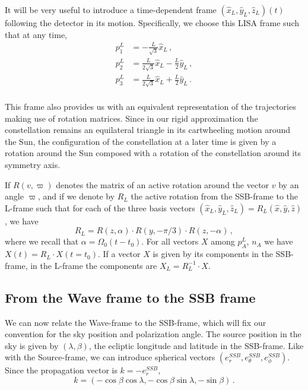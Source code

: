 \documentclass[aps,showpacs,twocolumn,prd,superscriptaddress,nofootinbib]{revtex4-1}
\newcommand{\be}{\begin{equation}}
\newcommand{\ee}{\end{equation}}
\newcommand{\bsub}{\begin{subequations}}
\newcommand{\esub}{\end{subequations}}
\begin{document}
It will be very useful to introduce a time-dependent frame $(\hat{x}_{L}, \hat{y}_{L}, \hat{z}_{L})(t)$ following the detector in its motion. Specifically, we choose this LISA frame such that at any time,
\bsub
\begin{align}
	p_{1}^{L} &= - \frac{L}{\sqrt{3}} \hat{x}_{L} \,,\\
	p_{2}^{L} &= \frac{L}{2\sqrt{3}} \hat{x}_{L} - \frac{L}{2} \hat{y}_{L} \,,\\
	p_{3}^{L} &= \frac{L}{2\sqrt{3}} \hat{x}_{L} + \frac{L}{2} \hat{y}_{L} \,.\\
\end{align}
\esub

This frame also provides us with an equivalent representation of the trajectories making use of rotation matrices. Since in our rigid approximation the constellation remains an equilateral triangle in its cartwheeling motion around the Sun, the configuration of the constellation at a later time is given by a rotation around the Sun composed with a rotation of the constellation around its symmetry axis.

If $R(v,\varpi)$ denotes the matrix of an active rotation around the vector $v$ by an angle $\varpi$, and if we denote by $R_{L}$ the active rotation from the SSB-frame to the L-frame such that for each of the three basis vectors $(\hat{x}_{L}, \hat{y}_{L}, \hat{z}_{L}) = R_{L} (\hat{x}, \hat{y}, \hat{z})$, we have
\be\label{eq:RL}
	R_{L} = R(z, \alpha) \cdot R(y, -\pi/3) \cdot R(z, -\alpha) \,,
\ee
where we recall that $\alpha = \Omega_{0} (t-t_{0}) $. For all vectors $X$ among $p_{A}^{L}$, $n_{A}$ we have $X(t) = R_{L} \cdot X(t=t_{0})$. If a vector $X$ is given by its components in the SSB-frame, in the L-frame the components are $X_{L} = R_{L}^{-1} \cdot X$.


\subsection{From the Wave frame to the SSB frame}
\label{sec:wavessbframe}

We can now relate the Wave-frame to the SSB-frame, which will fix our convention for the sky position and polarization angle. The source position in the sky is given by $(\lambda, \beta)$, the ecliptic longitude and latitude in the SSB-frame. Like with the Source-frame, we can introduce spherical vectors $(e_{r}^{SSB}, e_{\theta}^{SSB}, e_{\phi}^{SSB})$. Since the propagation vector is $k = - e_{r}^{SSB}$,
\be
	k = (- \cos\beta\cos\lambda, - \cos\beta\sin\lambda, -\sin\beta) \,.
\ee
\end{document}
